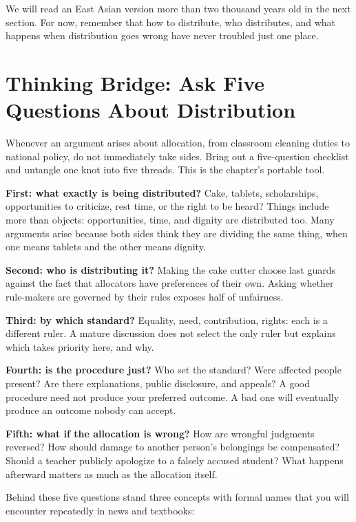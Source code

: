 We will read an East Asian version more than two thousand years old in the next section. For now, remember that how to distribute, who distributes, and what happens when distribution goes wrong have never troubled just one place.

\section[Five Questions About Distribution]{Thinking Bridge: Ask Five Questions About Distribution}
Whenever an argument arises about allocation, from classroom cleaning duties to national policy, do not immediately take sides. Bring out a five-question checklist and untangle one knot into five threads. This is the chapter's portable tool.

\textbf{First: what exactly is being distributed?} Cake, tablets, scholarships, opportunities to criticize, rest time, or the right to be heard? Things include more than objects: opportunities, time, and dignity are distributed too. Many arguments arise because both sides think they are dividing the same thing, when one means tablets and the other means dignity.

\textbf{Second: who is distributing it?} Making the cake cutter choose last guards against the fact that allocators have preferences of their own. Asking whether rule-makers are governed by their rules exposes half of unfairness.

\textbf{Third: by which standard?} Equality, need, contribution, rights: each is a different ruler. A mature discussion does not select the only ruler but explains which takes priority here, and why.

\textbf{Fourth: is the procedure just?} Who set the standard? Were affected people present? Are there explanations, public disclosure, and appeals? A good procedure need not produce your preferred outcome. A bad one will eventually produce an outcome nobody can accept.

\textbf{Fifth: what if the allocation is wrong?} How are wrongful judgments reversed? How should damage to another person's belongings be compensated? Should a teacher publicly apologize to a falsely accused student? What happens afterward matters as much as the allocation itself.

Behind these five questions stand three concepts with formal names that you will encounter repeatedly in news and textbooks:

